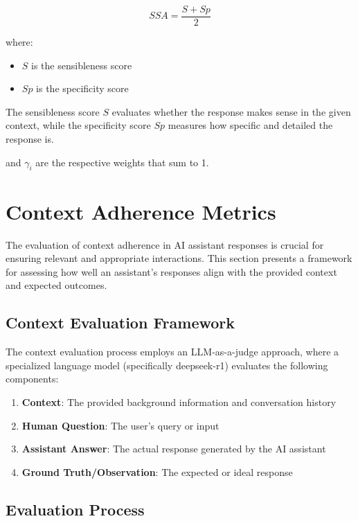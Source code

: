 \documentclass[12pt]{article}
\begin{document}
\begin{equation}
    SSA = \frac{S + Sp}{2}
\end{equation}

where:
\begin{itemize}
    \item $S$ is the sensibleness score
    \item $Sp$ is the specificity score
\end{itemize}

The sensibleness score $S$ evaluates whether the response makes sense in the given context, while the specificity score $Sp$ measures how specific and detailed the response is.


and $\gamma_i$ are the respective weights that sum to 1.

\section{Context Adherence Metrics}

The evaluation of context adherence in AI assistant responses is crucial for ensuring relevant and appropriate interactions. This section presents a framework for assessing how well an assistant's responses align with the provided context and expected outcomes.

\subsection{Context Evaluation Framework}

The context evaluation process employs an LLM-as-a-judge approach, where a specialized language model (specifically deepseek-r1) evaluates the following components:

\begin{enumerate}
    \item \textbf{Context}: The provided background information and conversation history
    \item \textbf{Human Question}: The user's query or input
    \item \textbf{Assistant Answer}: The actual response generated by the AI assistant
    \item \textbf{Ground Truth/Observation}: The expected or ideal response
\end{enumerate}

\subsection{Evaluation Process}
\end{document}
